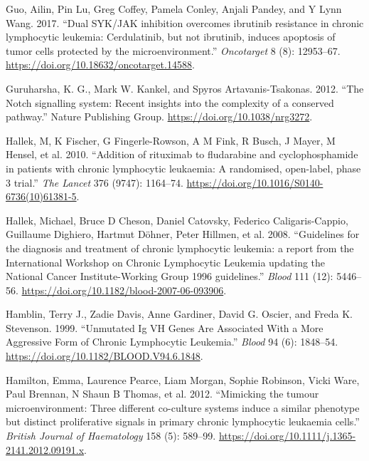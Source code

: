 \documentclass[11pt, a4paper, twosided]{book}
\newenvironment{CSLReferences}%
  {}%
  {\par}
\begin{document}
\begin{CSLReferences}{1}{0}
\leavevmode{}%
Guo, Ailin, Pin Lu, Greg Coffey, Pamela Conley, Anjali Pandey, and Y Lynn Wang. 2017. {``{Dual SYK/JAK inhibition overcomes ibrutinib resistance in chronic lymphocytic leukemia: Cerdulatinib, but not ibrutinib, induces apoptosis of tumor cells protected by the microenvironment.}''} \emph{Oncotarget} 8 (8): 12953--67. \url{https://doi.org/10.18632/oncotarget.14588}.

\leavevmode{}%
Guruharsha, K. G., Mark W. Kankel, and Spyros Artavanis-Tsakonas. 2012. {``{The Notch signalling system: Recent insights into the complexity of a conserved pathway}.''} Nature Publishing Group. \url{https://doi.org/10.1038/nrg3272}.

\leavevmode{}%
Hallek, M, K Fischer, G Fingerle-Rowson, A M Fink, R Busch, J Mayer, M Hensel, et al. 2010. {``{Addition of rituximab to fludarabine and cyclophosphamide in patients with chronic lymphocytic leukaemia: A randomised, open-label, phase 3 trial}.''} \emph{The Lancet} 376 (9747): 1164--74. \url{https://doi.org/10.1016/S0140-6736(10)61381-5}.

\leavevmode{}%
Hallek, Michael, Bruce D Cheson, Daniel Catovsky, Federico Caligaris-Cappio, Guillaume Dighiero, Hartmut Döhner, Peter Hillmen, et al. 2008. {``{Guidelines for the diagnosis and treatment of chronic lymphocytic leukemia: a report from the International Workshop on Chronic Lymphocytic Leukemia updating the National Cancer Institute-Working Group 1996 guidelines.}''} \emph{Blood} 111 (12): 5446--56. \url{https://doi.org/10.1182/blood-2007-06-093906}.

\leavevmode{}%
Hamblin, Terry J., Zadie Davis, Anne Gardiner, David G. Oscier, and Freda K. Stevenson. 1999. {``{Unmutated Ig VH Genes Are Associated With a More Aggressive Form of Chronic Lymphocytic Leukemia}.''} \emph{Blood} 94 (6): 1848--54. \url{https://doi.org/10.1182/BLOOD.V94.6.1848}.

\leavevmode{}%
Hamilton, Emma, Laurence Pearce, Liam Morgan, Sophie Robinson, Vicki Ware, Paul Brennan, N Shaun B Thomas, et al. 2012. {``{Mimicking the tumour microenvironment: Three different co-culture systems induce a similar phenotype but distinct proliferative signals in primary chronic lymphocytic leukaemia cells}.''} \emph{British Journal of Haematology} 158 (5): 589--99. \url{https://doi.org/10.1111/j.1365-2141.2012.09191.x}.


\end{CSLReferences}
\end{document}
